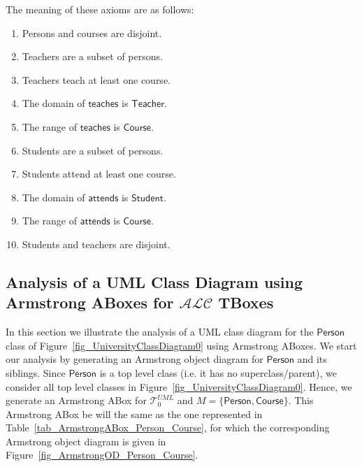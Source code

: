 \documentclass{amsart}
\begin{document}
  The meaning of these axioms are as follows:
  \begin{enumerate}
  	\item Persons and courses are disjoint.
  	\item Teachers are a subset of persons.
  	\item Teachers teach at least one course.
  	\item The domain of $\mathsf{teaches}$ is $\mathsf{Teacher}$.
  	\item The range of $\mathsf{teaches}$ is $\mathsf{Course}$.
  	\item Students are a subset of persons.
  	\item Students attend at least one course.
  	\item The domain of $\mathsf{attends}$ is $\mathsf{Student}$.
	\item The range of $\mathsf{attends}$ is $\mathsf{Course}$. 
	\item Students and teachers are disjoint.
  \end{enumerate}


   
    \subsection{Analysis of a UML Class Diagram using Armstrong ABoxes for $\mathcal{ALC}$ TBoxes}
    In this section we illustrate the analysis of a UML class diagram for the $\mathsf{Person}$ class of Figure~\ref{fig_UniversityClassDiagram0} using Armstrong ABoxes.  We start our analysis by generating an Armstrong object diagram for $\mathsf{Person}$ and its siblings. Since $\mathsf{Person}$ is a top level class (i.e. it has no superclass/parent), we consider all top level classes in Figure~\ref{fig_UniversityClassDiagram0}. Hence, we generate an Armstrong ABox for $\mathcal{T}_0^{UML}$ and $M = \{\mathsf{Person}, \mathsf{Course}\}$. This Armstrong ABox be will the same as the one represented in Table~\ref{tab_ArmstrongABox_Person_Course}, for which the corresponding Armstrong object diagram is given in Figure~\ref{fig_ArmstrongOD_Person_Course}. 
    
\end{document}
